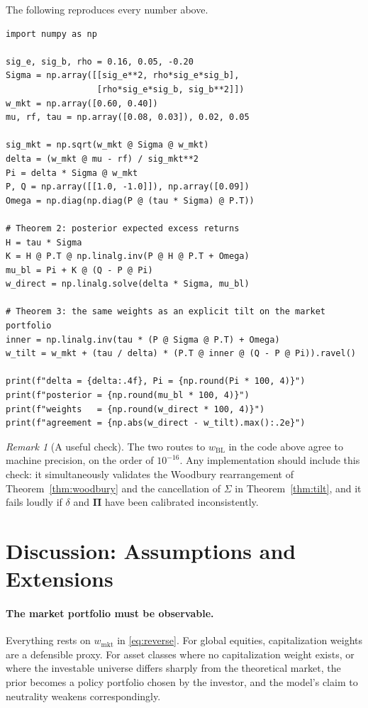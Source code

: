 \documentclass[11pt]{article}
\theoremstyle{remark}
\newtheorem*{remark}{Remark}
\theoremstyle{definition}
\begin{document}
The following reproduces every number above.

\begin{verbatim}
import numpy as np

sig_e, sig_b, rho = 0.16, 0.05, -0.20
Sigma = np.array([[sig_e**2, rho*sig_e*sig_b],
                  [rho*sig_e*sig_b, sig_b**2]])
w_mkt = np.array([0.60, 0.40])
mu, rf, tau = np.array([0.08, 0.03]), 0.02, 0.05

sig_mkt = np.sqrt(w_mkt @ Sigma @ w_mkt)
delta = (w_mkt @ mu - rf) / sig_mkt**2
Pi = delta * Sigma @ w_mkt
P, Q = np.array([[1.0, -1.0]]), np.array([0.09])
Omega = np.diag(np.diag(P @ (tau * Sigma) @ P.T))

# Theorem 2: posterior expected excess returns
H = tau * Sigma
K = H @ P.T @ np.linalg.inv(P @ H @ P.T + Omega)
mu_bl = Pi + K @ (Q - P @ Pi)
w_direct = np.linalg.solve(delta * Sigma, mu_bl)

# Theorem 3: the same weights as an explicit tilt on the market portfolio
inner = np.linalg.inv(tau * (P @ Sigma @ P.T) + Omega)
w_tilt = w_mkt + (tau / delta) * (P.T @ inner @ (Q - P @ Pi)).ravel()

print(f"delta = {delta:.4f}, Pi = {np.round(Pi * 100, 4)}")
print(f"posterior = {np.round(mu_bl * 100, 4)}")
print(f"weights   = {np.round(w_direct * 100, 4)}")
print(f"agreement = {np.abs(w_direct - w_tilt).max():.2e}")
\end{verbatim}

\begin{remark}[A useful check]
\label{rem:check}
The two routes to $w_{\mathrm{BL}}$ in the code above agree to machine precision, on the order of $10^{-16}$. Any implementation should include this check: it simultaneously validates the Woodbury rearrangement of Theorem~\ref{thm:woodbury} and the cancellation of $\Sigma$ in Theorem~\ref{thm:tilt}, and it fails loudly if $\delta$ and $\boldsymbol\Pi$ have been calibrated inconsistently.
\end{remark}

\section{Discussion: Assumptions and Extensions}
\label{sec:discussion}

\paragraph{The market portfolio must be observable.} Everything rests on $w_{\mathrm{mkt}}$ in \eqref{eq:reverse}. For global equities, capitalization weights are a defensible proxy. For asset classes where no capitalization weight exists, or where the investable universe differs sharply from the theoretical market, the prior becomes a policy portfolio chosen by the investor, and the model's claim to neutrality weakens correspondingly.
\end{document}
